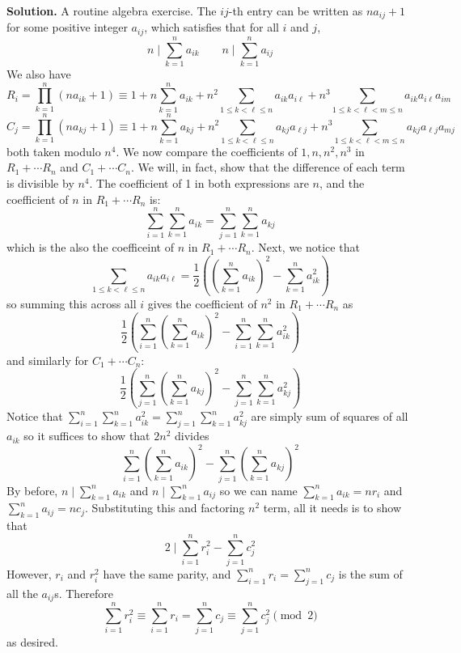 \documentclass[11pt,a4paper]{article}
\begin{document}
\begin{enumerate}
	\textbf{Solution.} A routine algebra exercise. The $ij$-th entry can be written as $na_{ij}+1$ for some positive integer $a_{ij}$, which satisfies that for all $i$ and $j$, 
	\[
	n\mid \displaystyle\sum_{k=1}^n a_{ik}\qquad
	n\mid \displaystyle\sum_{k=1}^n a_{ij}
	\]
	We also have 
	\[
	R_i = \displaystyle\prod_{k=1}^n (na_{ik}+1)
	\equiv 1 + n\displaystyle\sum_{k=1}^n a_{ik} + n^2 \displaystyle\sum_{1\le k<\ell\le n} a_{ik}a_{i\ell}
	+n^3 \displaystyle\sum_{1\le k<\ell<m\le n} a_{ik}a_{i\ell}a_{im}
	\]\[
	C_j = \displaystyle\prod_{k=1}^n (na_{kj}+1)
	\equiv 1 + n\displaystyle\sum_{k=1}^n a_{kj} + n^2 \displaystyle\sum_{1\le k<\ell\le n} a_{kj}a_{\ell j}
	+n^3 \displaystyle\sum_{1\le k<\ell<m\le n} a_{kj}a_{\ell j}a_{mj}
	\]
	both taken modulo $n^4$. 
	We now compare the coefficients of $1, n, n^2, n^3$ in $R_1+\cdots R_n$ and $C_1+\cdots C_n$. 
	We will, in fact, show that the difference of each term is divisible by $n^4$. 
	The coefficient of 1 in both expressions are $n$, and the coefficient of $n$ in $R_1+\cdots R_n$ is: 
	\[
	\displaystyle\sum_{i=1}^n \displaystyle\sum_{k=1}^n a_{ik}
	=\displaystyle\sum_{j=1}^n \displaystyle\sum_{k=1}^n a_{kj}
	\]
	which is the also the coefficeint of $n$ in $R_1+\cdots R_n$. 
	Next, we notice that 
	\[
	\displaystyle\sum_{1\le k<\ell\le n} a_{ik}a_{i\ell}
	=\frac 12 \left((\displaystyle\sum_{k=1}^n a_{ik})^2 - \displaystyle\sum_{k=1}^n a_{ik}^2\right)
	\]
	so summing this across all $i$ gives the coefficient of $n^2$ in $R_1+\cdots R_n$ as 
	\[
	\frac 12 \left(\displaystyle\sum_{i=1}^n(\displaystyle\sum_{k=1}^n a_{ik})^2 - \displaystyle\sum_{i=1}^n\displaystyle\sum_{k=1}^n a_{ik}^2\right)
	\]
	and similarly for $C_1+\cdots C_n$: 
	\[
	\frac 12 \left(\displaystyle\sum_{j=1}^n(\displaystyle\sum_{k=1}^n a_{kj})^2 - \displaystyle\sum_{j=1}^n\displaystyle\sum_{k=1}^n a_{kj}^2\right)
	\]
	Notice that $\displaystyle\sum_{i=1}^n\displaystyle\sum_{k=1}^n a_{ik}^2=\displaystyle\sum_{j=1}^n\displaystyle\sum_{k=1}^n a_{kj}^2$ are simply sum of squares of all $a_{ik}$ so it suffices to show that $2n^2$ divides 
	\[
	\displaystyle\sum_{i=1}^n(\displaystyle\sum_{k=1}^n a_{ik})^2
	-\displaystyle\sum_{j=1}^n(\displaystyle\sum_{k=1}^n a_{kj})^2
	\]
	By before, $n\mid \displaystyle\sum_{k=1}^n a_{ik}$ and $n\mid \displaystyle\sum_{k=1}^n a_{ij}$ so we can name $\displaystyle\sum_{k=1}^n a_{ik}=nr_i$ and $\displaystyle\sum_{k=1}^n a_{ij}=nc_j$. Substituting this and factoring $n^2$ term, all it needs is to show that 
	\[
	2\mid \displaystyle\sum_{i=1}^n r_i^2
	-\displaystyle\sum_{j=1}^n c_j^2
	\]
	However, $r_i$ and $r_i^2$ have the same parity, and $\displaystyle\sum_{i=1}^n r_i=\displaystyle\sum_{j=1}^n c_j$ is the sum of all the $a_{ij}$s. Therefore 
	\[
	 \displaystyle\sum_{i=1}^n r_i^2\equiv \displaystyle\sum_{i=1}^n r_i=\displaystyle\sum_{j=1}^n c_j
	 \equiv \displaystyle\sum_{j=1}^n c_j^2\pmod{2}
	\]
	as desired. 
	

\end{enumerate}
\end{document}
